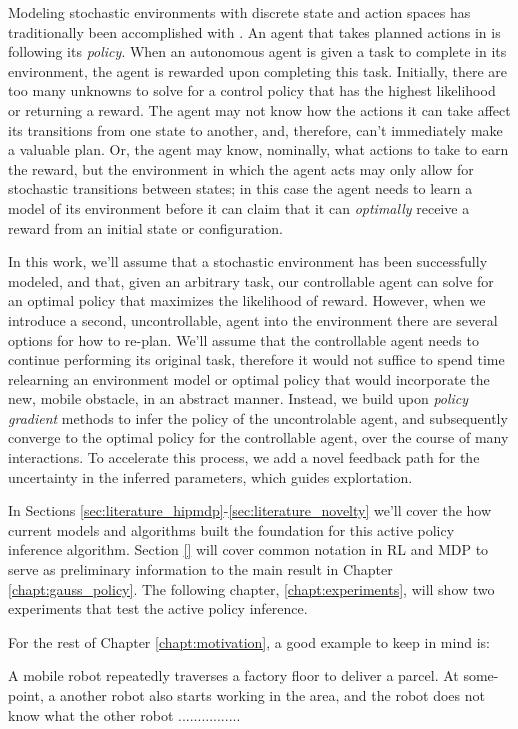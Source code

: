     Modeling stochastic environments with discrete state and action spaces has traditionally been accomplished with
    . An agent that takes planned actions in  is following its \textit{policy}. When an autonomous
    agent is given a task to complete in its environment, the agent is rewarded upon completing this task. Initially,
    there are too many unknowns to solve for a control policy that has the highest likelihood or returning a reward. The
    agent may not know how the actions it can take affect its transitions from one state to another, and, therefore,
    can't immediately make a valuable plan. Or, the agent may know, nominally, what actions to take to earn the reward,
    but the environment in which the agent acts may only allow for stochastic transitions between states; in this case
    the agent needs to learn a model of its environment before it can claim that it can \textit{optimally} receive a
    reward from an initial state or configuration.

    In this work, we'll assume that a stochastic environment has been successfully modeled, and that, given an arbitrary
    task, our controllable agent can solve for an optimal policy that maximizes the likelihood of reward. However, when
    we introduce a second, uncontrollable, agent into the environment there are several options for how to re-plan.
    We'll assume that the controllable agent needs to continue performing its original task, therefore it would not
    suffice to spend time relearning an environment model or optimal policy that would incorporate the new, mobile
    obstacle, in an abstract manner.  Instead, we build upon \textit{policy gradient} methods to infer the policy of the
    uncontrolable agent, and subsequently converge to the optimal policy for the controllable agent, over the course of
    many interactions. To accelerate this process, we add a novel feedback path for the uncertainty in the inferred
    parameters, which guides explortation.

    In Sections \ref{sec:literature_hipmdp}-\ref{sec:literature_novelty} we'll cover the how current models and
    algorithms built the foundation for this active policy inference algorithm. Section \ref{} will cover common
    notation in \ac{RL} and \ac{MDP} to serve as preliminary information to the main result in Chapter
    \ref{chapt:gauss_policy}. The following chapter, \ref{chapt:experiments}, will show two experiments that test the
    active policy inference.


    For the rest of Chapter \ref{chapt:motivation}, a good example to keep in mind is:
    \begin{problem}
        A mobile robot repeatedly traverses a factory floor to deliver a parcel. At some-point, a another robot also
        starts working in the area, and the robot does not know what the other robot ................
    \end{problem}


